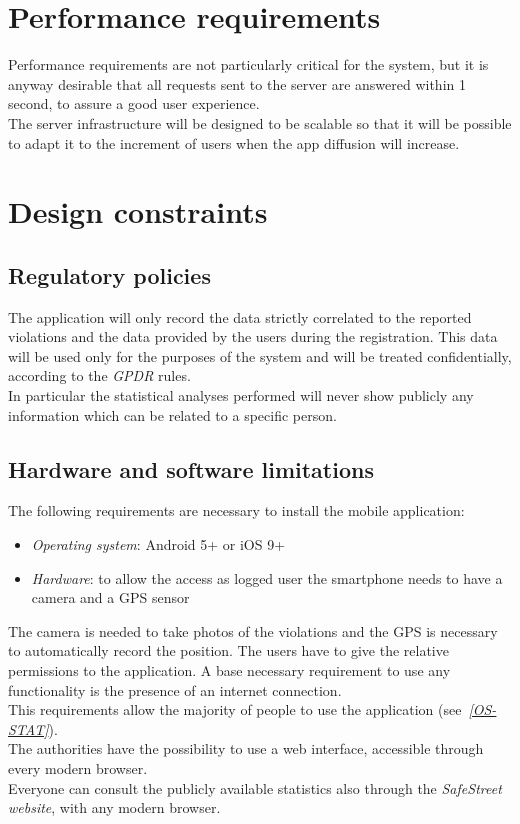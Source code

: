 \documentclass[a4paper]{report}
\begin{document}
\section{Performance requirements}
Performance requirements are not particularly critical for the system, but it is anyway desirable that all requests sent to the server are answered within 1 second, to assure a good user experience. \\
The server infrastructure will be designed to be scalable so that it will be possible to adapt it to the increment of users when the app diffusion will increase.
\section{Design constraints}
\subsection{Regulatory policies}
The application will only record the data strictly correlated to the reported violations and the data provided by the users during the registration. This data will be used only for the purposes of the system and will be treated confidentially, according to the \textit{GPDR} rules.\\
In particular the statistical analyses performed will never show publicly any information which can be related to a specific person.
\subsection{Hardware and software limitations}
The following requirements are necessary to install the mobile application:
\begin{itemize}
\item \textit{Operating system}: Android 5+ or iOS 9+
\item \textit{Hardware}: to allow the access as logged user the smartphone needs to have a camera and a GPS sensor
\end{itemize}
The camera is needed to take photos of the violations and the GPS is necessary to automatically record the position. The users have to give the relative permissions to the application. A base necessary requirement to use any functionality is the presence of an internet connection.\\
This requirements allow the majority of people to use the application \mbox{(see \hyperref[ref:os-stats]{\textit{[OS-STAT]}}).}\\
The authorities have the possibility to use a web interface, accessible through every modern browser.\\
Everyone can consult the publicly available statistics also through the \textit{SafeStreet website}, with any modern browser.
\end{document}
